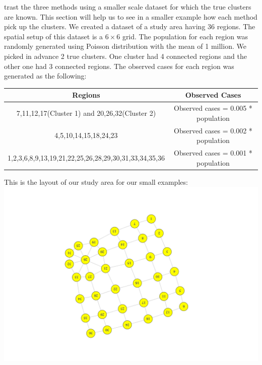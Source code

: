 \documentclass[12pt]{article}
\begin{document}
\begin{enumerate}
trast the three methods using a smaller scale dataset for which the true clusters are known. This section will help us to see in a smaller example how each method pick up the clusters. We created a dataset of a study area having 36 regions. The spatial setup of this dataset is a $6\times6$ grid. The population for each region was randomly generated using Poisson distribution with the mean of 1 million. We picked in advance 2 true clusters. One cluster had 4 connected regions and the other one had 3 connected regions. The observed cases for each region was generated as the following: \\
		
	\begin{tabular}{|c|c|}
	\hline
	Regions & Observed Cases \\
	\hline
	7,11,12,17(Cluster 1) and 20,26,32(Cluster 2) & Observed cases = 0.005 * population \\ 
	4,5,10,14,15,18,24,23 & Observed cases = 0.002 * population \\
	1,2,3,6,8,9,13,19,21,22,25,26,28,29,30,31,33,34,35,36 & Observed cases = 0.001 * population \\
	\hline
	\end{tabular}	
	
	\end{enumerate} 
	
	This is the layout of our study area for our small examples:\\
		\includegraphics[scale=0.3]{Area_layout} \\
	
\end{document}
